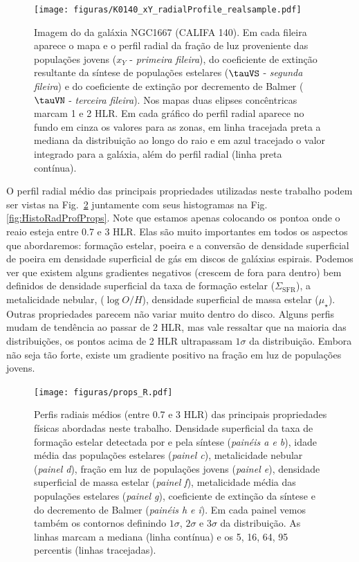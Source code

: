 \begin{figure}
	\centering
	\texttt{[image: figuras/K0140\_xY\_radialProfile\_realsample.pdf]}
	\caption[Imagem e exemplos de mapas e perfis radiais]
	{Imagem do \SDSS da galáxia NGC1667 (CALIFA 140). Em cada fileira aparece o mapa e o perfil radial
da fração de luz proveniente das populações jovens ($x_Y$ - \emph{primeira fileira}), do
coeficiente de extinção resultante da síntese de populações estelares ($\tauVS$ - \emph{segunda
fileira}) e do coeficiente de extinção por decremento de Balmer ($\tauVN$ - \emph{terceira
fileira}). Nos mapas duas elipses concêntricas marcam 1 e 2 HLR. Em cada gráfico do perfil radial
aparece no fundo em cinza os valores para as zonas, em linha tracejada preta a mediana da
distribuição ao longo do raio e em azul tracejado o valor integrado para a galáxia, além do perfil
radial (linha preta contínua).}
	\label{fig:K0140xYRadProf}
\end{figure}

O perfil radial médio das principais propriedades utilizadas neste trabalho podem ser vistas na
Fig.\ \ref{fig:RadProfProps} juntamente com seus histogramas na Fig. \ref{fig:HistoRadProfProps}.
Note que estamos apenas colocando os pontoa onde o reaio esteja entre 0.7 e 3 HLR. Elas são muito
importantes em todos os aspectos que abordaremos: formação estelar, poeira e a conversão de
densidade superficial de poeira em densidade superficial de gás em discos de galáxias espirais.
Podemos ver que existem alguns gradientes negativos (crescem de fora para dentro) bem definidos de
densidade superficial da taxa de formação estelar ($\Sigma_{\mathrm{SFR}}$), a metalicidade nebular,
($\log O/H$), densidade superficial de massa estelar ($\mu_\star$). Outras propriedades parecem não
variar muito dentro do disco. Alguns perfis mudam de tendência ao passar de 2 HLR, mas vale
ressaltar que na maioria das distribuições, os pontos acima de 2 HLR ultrapassam $1\sigma$ da
distribuição. Embora não seja tão forte, existe um gradiente positivo na fração em luz de populações
jovens.

\begin{figure}
	\centering
	\texttt{[image: figuras/props\_R.pdf]}
	\caption[Perfis radiais das propriedades físicas]
	{Perfis radiais médios (entre 0.7 e 3 HLR) das principais propriedades físicas abordadas neste
trabalho. Densidade superficial da taxa de formação estelar detectada por \Halpha e pela síntese
({\em painéis a e b}), idade média das populações estelares ({\em painel c}), metalicidade nebular
({\em painel d}), fração em luz de populações jovens ({\em painel e}), densidade superficial de
massa estelar ({\em painel f}), metalicidade média das populações estelares ({\em painel g}),
coeficiente de extinção da síntese e do decremento de Balmer ({\em painéis h e i}). Em cada painel
vemos também os contornos definindo $1\sigma$, $2\sigma$ e $3\sigma$ da distribuição. As linhas
marcam a mediana (linha contínua) e os 5, 16, 64, 95 percentis (linhas tracejadas).}
	\label{fig:RadProfProps}
\end{figure}

